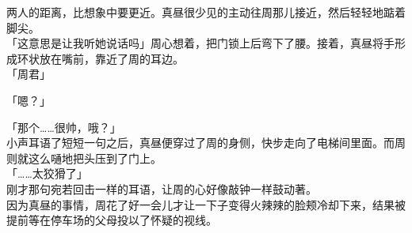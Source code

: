 两人的距离，比想象中要更近。真昼很少见的主动往周那儿接近，然后轻轻地踮着脚尖。\\

「这意思是让我听她说话吗」周心想着，把门锁上后弯下了腰。接着，真昼将手形成环状放在嘴前，靠近了周的耳边。\\

「周君」

「嗯？」

「那个……很帅，哦？」\\

小声耳语了短短一句之后，真昼便穿过了周的身侧，快步走向了电梯间里面。而周则就这么嗵地把头压到了门上。\\

「……太狡猾了」\\

刚才那句宛若回击一样的耳语，让周的心好像敲钟一样鼓动著。\\

因为真昼的事情，周花了好一会儿才让一下子变得火辣辣的脸颊冷却下来，结果被提前等在停车场的父母投以了怀疑的视线。
